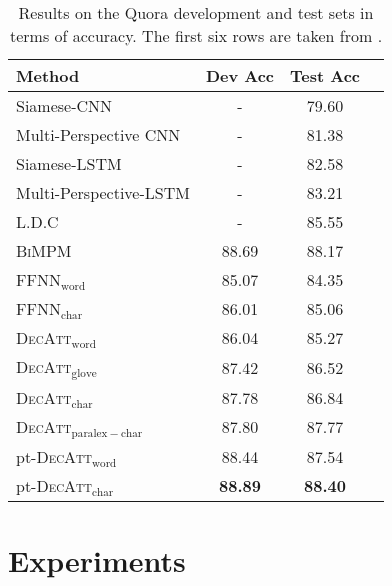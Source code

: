 \documentclass[11pt,letterpaper]{article}
\begin{document}
\begin{table}[!t]

\centering
\begin{tabular*}{\columnwidth}{lccr}
\toprule
Method & Dev Acc & Test Acc\\
\midrule
Siamese-CNN & - & 79.60\\
Multi-Perspective CNN & - & 81.38\\
Siamese-LSTM & - & 82.58\\
Multi-Perspective-LSTM & - & 83.21\\
L.D.C & - & 85.55\\
\textsc{BiMPM} & 88.69 & 88.17\\
\midrule
\textsc{FFNN}$_\mathrm{word}$ &  85.07 & 84.35 &  \\
\textsc{FFNN}$_\mathrm{char}$ & 86.01 & 85.06\\
\midrule
\textsc{DecAtt}$_\mathrm{word}$ & 86.04 & 85.27 \\
\textsc{DecAtt}$_\mathrm{glove}$ & 87.42 & 86.52 \\
\textsc{DecAtt}$_\mathrm{char}$ & 87.78 & 86.84\\
\textsc{DecAtt}$_\mathrm{paralex-char}$ & 87.80 & 87.77\\
\midrule
pt-\textsc{DecAtt}$_\mathrm{word}$ & 88.44 & 87.54\\
pt-\textsc{DecAtt}$_\mathrm{char}$ & \bf{88.89} & \bf{88.40}\\
\bottomrule
\end{tabular*}
\caption{Results on the Quora development and test sets in terms of accuracy.  The first six rows are taken from \cite{wang:2017:ijcai}.}
\label{table:quora-results}
\end{table}

\section{Experiments}\label{sec:experiments}
\end{document}
